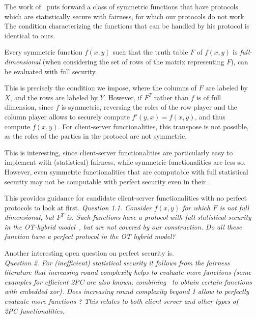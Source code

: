 \documentclass{llncs}
\begin{document}
The work of~\cite{Ash14} puts forward a class of symmetric functions that have protocols which are statistically secure with fairness, for which our protocols do not work. The condition characterizing the functions that can be handled by his protocol is identical to ours. 

\begin{theorem}
Every symmetric function $f(x,y)$ such that 	
the truth table $F$ of $f(x,y)$ is \emph{full-dimensional} (when considering the set of rows of the matrix representing $F$), can be evaluated with full security. 
\end{theorem}

This is precisely the condition we impose, where the columns of $F$ are labeled by $X$, and the rows are labeled by $Y$. However, if $F^T$
rather than $f$ is of full dimension, since $f$ is symmetric, reversing the roles of the row player and the column player allows to securely compute $f'(y,x)=f(x,y)$, and thus compute $f(x,y)$. 
For client-server functionalities, this transpose is not possible, as the roles of the parties in the protocol are not symmetric.

This is interesting, since client-server functionalities are particularly easy to implement with (statistical) fairness, while symmetric functionalities are less so. However, even symmetric functionalities that are computable with full statistical security may not be computable with perfect security even in their .

This provides guidance for candidate client-server functionalities  
with no perfect protocols to look at first.
\emph{Question 1.1.
Consider $f(x,y)$ for which $F$ is not full dimensional, but $F^T$ is.
Such functions have a protocol with full statistical security in the OT-hybrid model~\cite{Ash14}, but are not covered by our construction. Do all these function have a perfect protocol in the OT hybrid model? 
}


Another interesting open question on perfect security is.\\ 

\emph{Question 2. For (inefficient) statistical security it follows from the fairness literature that increasing round complexity helps to evaluate more functions (some examples for efficient 2PC are also known: combining~\cite{Ash14,GHKL08} to obtain certain functions with embedded xor).
Does increasing round complexity beyond 1 allow to perfectly evaluate more functions ? This relates to both client-server and other types of 2PC functionalities.} \\
\end{document}
